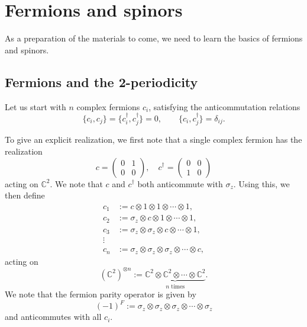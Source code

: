 \documentclass[12pt]{article}
\numberwithin{equation}{section}
\numberwithin{figure}{section}
\theoremstyle{remark}
\def\bC{\mathbb{C}}
\begin{document}
\section{Fermions and spinors}

As a preparation of the materials to come, we need to learn the basics of 
fermions and spinors.

\subsection{Fermions and the 2-periodicity}
Let us start with $n$ complex fermions $c_i$, satisfying the anticommutation relations \begin{equation}
\{c_i , c_j\}=\{c_i^\dagger,c_j^\dagger\}=0,\qquad
\{c_i,c_j^\dagger\}=\delta_{ij}.
\end{equation}

To give an explicit realization, we first note that a single complex fermion has the realization
\begin{equation}
c=\begin{pmatrix}
0 & 1 \\
0 & 0 
\end{pmatrix},\quad
c^\dagger=\begin{pmatrix}
0 & 0\\
1 & 0
\end{pmatrix}
\end{equation} acting on $\bC^2$.
We note that $c$ and $c^\dagger$ both anticommute with $\sigma_z$.
Using this, we then define \begin{equation}
\begin{aligned}
c_1 &:= c \otimes 1 \otimes 1\otimes \cdots \otimes 1 ,\\
c_2 &:= \sigma_z \otimes c \otimes 1\otimes \cdots \otimes 1 ,\\
c_3 &:= \sigma_z \otimes \sigma_z \otimes c \otimes \cdots \otimes 1 ,\\
\vdots \\
c_n &:= \sigma_z \otimes\sigma_z \otimes \sigma_z \otimes\cdots\otimes c,
\end{aligned} 
\label{complex-fermions}
\end{equation} acting on \begin{equation}
(\bC^2)^{\otimes n} := \underbrace{\bC^2\otimes \bC^2\otimes \cdots \otimes \bC^2}_\text{$n$ times}.
\end{equation}
We note that the fermion parity operator is given by \begin{equation}
(-1)^F := \sigma_z \otimes\sigma_z \otimes \sigma_z \otimes\cdots\otimes \sigma_z
\end{equation}
and anticommutes with all $c_i$.
\end{document}
